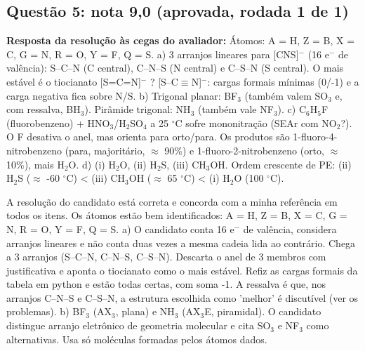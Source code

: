 \documentclass{article}%
\begin{document}
\subsection*{Questão 5: nota 9,0 (aprovada, rodada 1 de 1)}%
\textbf{Resposta da resolução às cegas do avaliador:} Átomos: A = H, Z = B, X = C, G = N, R = O, Y = F, Q = S.\newline%
a) 3 arranjos lineares para {[}CNS{]}$^{-}$ (16 e$^{-}$ de valência): S--C--N (C central), C--N--S (N central) e C--S--N (S central). O mais estável é o tiocianato {[}S=C=N{]}$^{-}$ ? {[}S--C$\equiv$N{]}$^{-}$: cargas formais mínimas (0/-1) e a carga negativa fica sobre N/S.\newline%
b) Trigonal planar: BF$_{3}$ (também valem SO$_{3}$ e, com ressalva, BH$_{3}$). Pirâmide trigonal: NH$_{3}$ (também vale NF$_{3}$).\newline%
c) C$_{6}$H$_{5}$F (fluorobenzeno) + HNO$_{3}$/H$_{2}$SO$_{4}$ a 25 $^\circ$C sofre mononitração (SEAr com NO$_{2}$?). O F desativa o anel, mas orienta para orto/para. Os produtos são 1{-}fluoro{-}4{-}nitrobenzeno (para, majoritário, $\approx$ 90\%) e 1{-}fluoro{-}2{-}nitrobenzeno (orto, $\approx$ 10\%), mais H$_{2}$O.\newline%
d) (i) H$_{2}$O, (ii) H$_{2}$S, (iii) CH$_{3}$OH. Ordem crescente de PE: (ii) H$_{2}$S ($\approx$ -60 $^\circ$C) < (iii) CH$_{3}$OH ($\approx$ 65 $^\circ$C) < (i) H$_{2}$O (100 $^\circ$C).\par %
A resolução do candidato está correta e concorda com a minha referência em todos os itens. Os átomos estão bem identificados: A = H, Z = B, X = C, G = N, R = O, Y = F, Q = S.\newline%
\newline%
a) O candidato conta 16 e$^{-}$ de valência, considera arranjos lineares e não conta duas vezes a mesma cadeia lida ao contrário. Chega a 3 arranjos (S--C--N, C--N--S, C--S--N). Descarta o anel de 3 membros com justificativa e aponta o tiocianato como o mais estável. Refiz as cargas formais da tabela em python e estão todas certas, com soma -1. A ressalva é que, nos arranjos C--N--S e C--S--N, a estrutura escolhida como 'melhor' é discutível (ver os problemas).\newline%
\newline%
b) BF$_{3}$ (AX$_{3}$, plana) e NH$_{3}$ (AX$_{3}$E, piramidal). O candidato distingue arranjo eletrônico de geometria molecular e cita SO$_{3}$ e NF$_{3}$ como alternativas. Usa só moléculas formadas pelos átomos dados.\newline%
\end{document}

